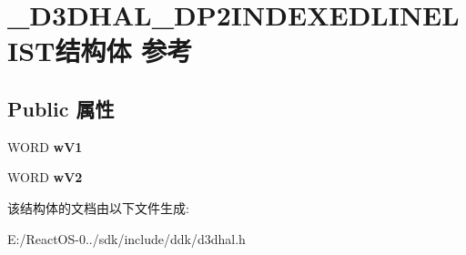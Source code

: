 \hypertarget{struct___d3_d_h_a_l___d_p2_i_n_d_e_x_e_d_l_i_n_e_l_i_s_t}{}\section{\+\_\+\+D3\+D\+H\+A\+L\+\_\+\+D\+P2\+I\+N\+D\+E\+X\+E\+D\+L\+I\+N\+E\+L\+I\+S\+T结构体 参考}
\label{struct___d3_d_h_a_l___d_p2_i_n_d_e_x_e_d_l_i_n_e_l_i_s_t}
\subsection*{Public 属性}
\begin{DoxyCompactItemize}
\item 
\mbox{\label{struct___d3_d_h_a_l___d_p2_i_n_d_e_x_e_d_l_i_n_e_l_i_s_t_a8904c3d17e5621266a1bc81e0d54d711}} 
W\+O\+RD {\bfseries w\+V1}
\item 
\mbox{\label{struct___d3_d_h_a_l___d_p2_i_n_d_e_x_e_d_l_i_n_e_l_i_s_t_aad2a6bd75169d77f3e93595a177a19ba}} 
W\+O\+RD {\bfseries w\+V2}
\end{DoxyCompactItemize}


该结构体的文档由以下文件生成\+:\begin{DoxyCompactItemize}
\item 
E\+:/\+React\+O\+S-\/0../sdk/include/ddk/d3dhal.\+h\end{DoxyCompactItemize}
